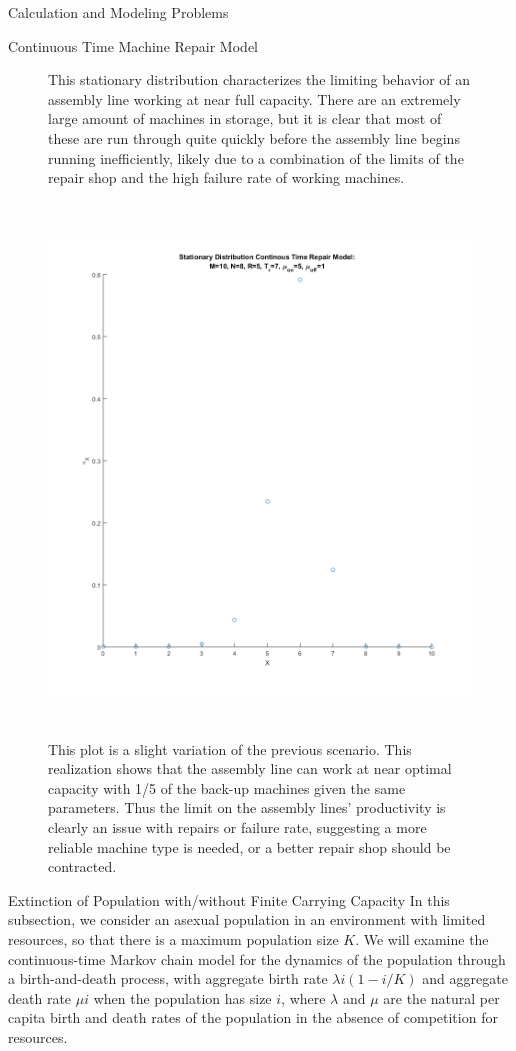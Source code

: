 \documentclass[12pt]{article}
\numberwithin{equation}{section}
\begin{document}
\begin{section}{Calculation and Modeling Problems}
\begin{subsection}{Continuous Time Machine Repair Model}
\begin{figure}
\caption{This stationary distribution characterizes the limiting behavior of an assembly line working at near full capacity. There are an extremely large amount of machines in storage, but it is clear that most of these are run through quite quickly before the assembly line begins running inefficiently, likely due to a combination of the limits of the repair shop and the high failure rate of working machines.}
\end{figure}
\begin{figure}
\centering
\includegraphics[width=400pt,height=400pt,keepaspectratio]{repairModelStationaryDist4.png}
\caption{This plot is a slight variation of the previous scenario. This realization shows that the assembly line can work at near optimal capacity with 1/5 of the back-up machines given the same parameters. Thus the limit on the assembly lines' productivity is clearly an issue with repairs or failure rate, suggesting a more reliable machine type is needed, or a better repair shop should be contracted.}
\end{figure}


    \end{subsection}
    \pagebreak
    \begin{subsection}{Extinction of Population with/without Finite Carrying Capacity}
    In this subsection, we consider an asexual population in an environment with limited resources, so that there is a maximum population size $K$. We will examine the continuous-time Markov chain model for the dynamics of the population through a birth-and-death process, with aggregate birth rate $\lambda i(1-i/K)$ and aggregate death rate $\mu i$ when the population has size $i$, where $\lambda$ and $\mu$ are the natural per capita birth and death rates of the population in the absence of competition for resources.\\


\end{subsection}
\end{section}
\end{document}
